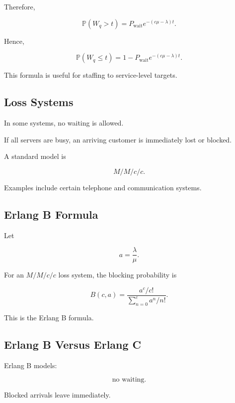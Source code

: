 Therefore,

\[
\boxed{
\mathbb{P}(W_q>t)
=
P_{\mathrm{wait}}
e^{-(c\mu-\lambda)t}.
}
\]

Hence,

\[
\boxed{
\mathbb{P}(W_q\leq t)
=
1
-
P_{\mathrm{wait}}
e^{-(c\mu-\lambda)t}.
}
\]

This formula is useful for staffing to service-level targets.

\subsection{Loss Systems}
\label{subsec:loss-systems}

In some systems, no waiting is allowed.

If all servers are busy, an arriving customer is immediately lost or
blocked.

A standard model is

\[
\boxed{
M/M/c/c.
}
\]

Examples include certain telephone and communication systems.

\subsection{Erlang B Formula}
\label{subsec:erlang-b}

Let

\[
a
=
\frac{\lambda}{\mu}.
\]

For an \(M/M/c/c\) loss system, the blocking probability is

\[
\boxed{
B(c,a)
=
\frac{
a^c/c!
}{
\displaystyle
\sum_{n=0}^{c}
a^n/n!
}.
}
\]

This is the Erlang B formula.

\subsection{Erlang B Versus Erlang C}
\label{subsec:erlang-b-versus-c}

Erlang B models:

\[
\boxed{
\text{no waiting}.
}
\]

Blocked arrivals leave immediately.

